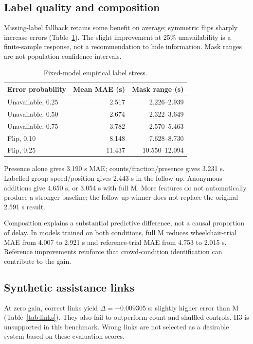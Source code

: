\documentclass[conference]{IEEEtran}
\begin{document}
\subsection{Label quality and composition}
Missing-label fallback retains some benefit on average; symmetric flips sharply increase errors (Table~\ref{tab:noise}). The slight improvement at 25\% unavailability is a finite-sample response, not a recommendation to hide information. Mask ranges are not population confidence intervals.

\begin{table}[t]\caption{Fixed-model empirical label stress.}\label{tab:noise}\centering
\begin{tabular}{lrr}\toprule Error probability&Mean MAE (s)&Mask range (s)\\\midrule
Unavailable, 0.25&2.517&2.226--2.939\\
Unavailable, 0.50&2.674&2.322--3.649\\
Unavailable, 0.75&3.782&2.570--5.463\\
Flip, 0.10&8.148&7.628--8.730\\
Flip, 0.25&11.437&10.550--12.094\\\bottomrule\end{tabular}\end{table}

Presence alone gives 3.190 s MAE; counts/fraction/presence gives 3.231 s. Labelled-group speed/position gives 2.443 s in the follow-up. Anonymous additions give 4.650 s, or 3.054 s with full M. More features do not automatically produce a stronger baseline; the follow-up winner does not replace the original 2.591 s result.

Composition explains a substantial predictive difference, not a causal proportion of delay. In models trained on both conditions, full M reduces wheelchair-trial MAE from 4.007 to 2.921 s and reference-trial MAE from 4.753 to 2.015 s. Reference improvements reinforce that crowd-condition identification can contribute to the gain.

\subsection{Synthetic assistance links}
At zero gain, correct links yield $\Delta=-0.009305$ s: slightly higher error than M (Table~\ref{tab:links}). They also fail to outperform count and shuffled controls. H3 is unsupported in this benchmark. Wrong links are not selected as a desirable system based on these evaluation scores.
\end{document}
